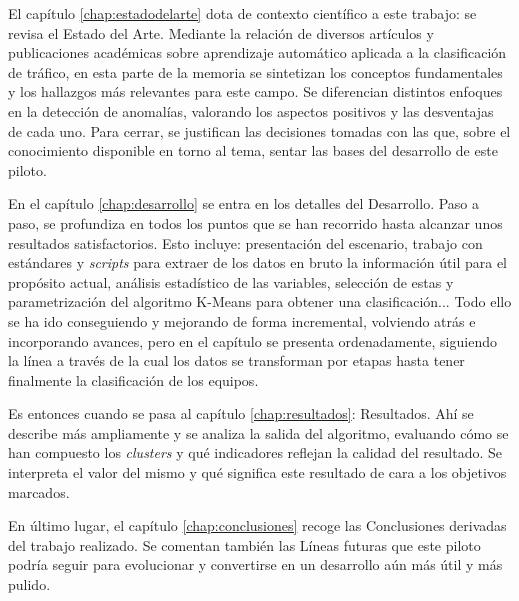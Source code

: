 El capítulo \ref{chap:estadodelarte} dota de contexto científico a este trabajo: se revisa el Estado del Arte.
Mediante la relación de diversos artículos y publicaciones académicas sobre aprendizaje automático aplicada a la clasificación de tráfico,
en esta parte de la memoria se sintetizan los conceptos fundamentales y los hallazgos más relevantes para este campo.
Se diferencian distintos enfoques en la detección de anomalías, valorando los aspectos positivos y las desventajas de cada uno.
Para cerrar, se justifican las decisiones tomadas con las que, sobre el conocimiento disponible en torno al tema, sentar las bases del desarrollo de este piloto.

En el capítulo \ref{chap:desarrollo} se entra en los detalles del Desarrollo.
Paso a paso, se profundiza en todos los puntos que se han recorrido hasta alcanzar unos resultados satisfactorios.
Esto incluye: presentación del escenario, trabajo con estándares y \emph{scripts} para extraer de los datos en bruto la información útil para el propósito actual,
análisis estadístico de las variables, selección de estas y parametrización del algoritmo K-Means para obtener una clasificación...
Todo ello se ha ido conseguiendo y mejorando de forma incremental, volviendo atrás e incorporando avances,
pero en el capítulo se presenta ordenadamente, siguiendo la línea a través de la cual los datos se transforman por etapas hasta tener finalmente la clasificación de los equipos.

Es entonces cuando se pasa al capítulo \ref{chap:resultados}: Resultados.
Ahí se describe más ampliamente y se analiza la salida del algoritmo, evaluando cómo se han compuesto los \emph{clusters} y qué indicadores reflejan la calidad del resultado.
Se interpreta el valor del mismo y qué significa este resultado de cara a los objetivos marcados.

En último lugar, el capítulo \ref{chap:conclusiones} recoge las Conclusiones derivadas del trabajo realizado.
Se comentan también las Líneas futuras que este piloto podría seguir para evolucionar y convertirse en un desarrollo aún más útil y más pulido.
